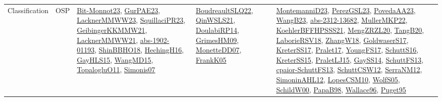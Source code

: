 {\begin{longtable}{lp{3cm}>{\raggedright}p{6cm}>{\raggedright}p{6cm}p{8cm}}
Classification & OSP & \href{papers/Bit-Monnot23.pdf}{Bit-Monnot23}\cite{Bit-Monnot23}, \href{articles/GurPAE23.pdf}{GurPAE23}\cite{GurPAE23}, \href{articles/LacknerMMWW23.pdf}{LacknerMMWW23}\cite{LacknerMMWW23}, \href{papers/SquillaciPR23.pdf}{SquillaciPR23}\cite{SquillaciPR23}, \href{papers/GeibingerKKMMW21.pdf}{GeibingerKKMMW21}\cite{GeibingerKKMMW21}, \href{papers/LacknerMMWW21.pdf}{LacknerMMWW21}\cite{LacknerMMWW21}, \href{articles/abs-1902-01193.pdf}{abs-1902-01193}\cite{abs-1902-01193}, \href{articles/ShinBBHO18.pdf}{ShinBBHO18}\cite{ShinBBHO18}, \href{papers/HechingH16.pdf}{HechingH16}\cite{HechingH16}, \href{papers/GayHLS15.pdf}{GayHLS15}\cite{GayHLS15}, \href{articles/WangMD15.pdf}{WangMD15}\cite{WangMD15}, \href{articles/TopalogluO11.pdf}{TopalogluO11}\cite{TopalogluO11}, \href{articles/Simonis07.pdf}{Simonis07}\cite{Simonis07} & \href{papers/BoudreaultSLQ22.pdf}{BoudreaultSLQ22}\cite{BoudreaultSLQ22}, \href{articles/QinWSLS21.pdf}{QinWSLS21}\cite{QinWSLS21}, \href{papers/DoulabiRP14.pdf}{DoulabiRP14}\cite{DoulabiRP14}, \href{papers/GrimesHM09.pdf}{GrimesHM09}\cite{GrimesHM09}, \href{papers/MonetteDD07.pdf}{MonetteDD07}\cite{MonetteDD07}, \href{papers/FrankK05.pdf}{FrankK05}\cite{FrankK05} & \href{articles/MontemanniD23.pdf}{MontemanniD23}\cite{MontemanniD23}, \href{papers/PerezGSL23.pdf}{PerezGSL23}\cite{PerezGSL23}, \href{papers/PovedaAA23.pdf}{PovedaAA23}\cite{PovedaAA23}, \href{papers/WangB23.pdf}{WangB23}\cite{WangB23}, \href{articles/abs-2312-13682.pdf}{abs-2312-13682}\cite{abs-2312-13682}, \href{articles/MullerMKP22.pdf}{MullerMKP22}\cite{MullerMKP22}, \href{articles/KoehlerBFFHPSSS21.pdf}{KoehlerBFFHPSSS21}\cite{KoehlerBFFHPSSS21}, \href{articles/MengZRZL20.pdf}{MengZRZL20}\cite{MengZRZL20}, \href{papers/TangB20.pdf}{TangB20}\cite{TangB20}, \href{articles/LaborieRSV18.pdf}{LaborieRSV18}\cite{LaborieRSV18}, \href{articles/ZhangW18.pdf}{ZhangW18}\cite{ZhangW18}, \href{papers/GoldwaserS17.pdf}{GoldwaserS17}\cite{GoldwaserS17}, \href{articles/KreterSS17.pdf}{KreterSS17}\cite{KreterSS17}, \href{papers/Pralet17.pdf}{Pralet17}\cite{Pralet17}, \href{papers/YoungFS17.pdf}{YoungFS17}\cite{YoungFS17}, \href{papers/SchuttS16.pdf}{SchuttS16}\cite{SchuttS16}, \href{papers/KreterSS15.pdf}{KreterSS15}\cite{KreterSS15}, \href{papers/PraletLJ15.pdf}{PraletLJ15}\cite{PraletLJ15}, \href{papers/GaySS14.pdf}{GaySS14}\cite{GaySS14}, \href{papers/SchuttFS13.pdf}{SchuttFS13}\cite{SchuttFS13}, \href{papers/cpaior-SchuttFS13.pdf}{cpaior-SchuttFS13}\cite{cpaior-SchuttFS13}, \href{papers/SchuttCSW12.pdf}{SchuttCSW12}\cite{SchuttCSW12}, \href{papers/SerraNM12.pdf}{SerraNM12}\cite{SerraNM12}, \href{papers/SimoninAHL12.pdf}{SimoninAHL12}\cite{SimoninAHL12}, \href{articles/LopesCSM10.pdf}{LopesCSM10}\cite{LopesCSM10}, \href{papers/WolfS05.pdf}{WolfS05}\cite{WolfS05}, \href{articles/SchildW00.pdf}{SchildW00}\cite{SchildW00}, \href{articles/PapaB98.pdf}{PapaB98}\cite{PapaB98}, \href{articles/Wallace96.pdf}{Wallace96}\cite{Wallace96}, \href{papers/Puget95.pdf}{Puget95}\cite{Puget95}\\

\end{longtable}}
